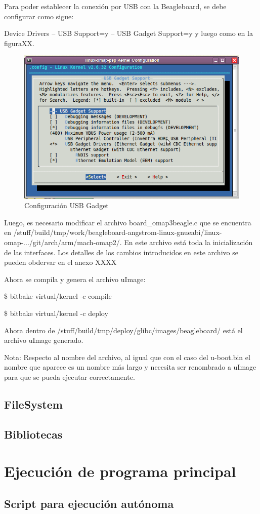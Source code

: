 Para poder establecer la conexión por USB con la Beagleboard, se debe configurar como sigue: 

Device Drivers – USB Support=y – USB Gadget Support=y y luego como en la figuraXX.

\begin{figure}[H]
\centering
  \begin{center}
  \includegraphics[scale=.4]{Imagenes/usb_chica.png} 
  \end{center}
  \caption{Configuración USB Gadget}\label{Fig:HW} 
\end{figure}

Luego, es necesario modificar el archivo board\_omap3beagle.c que se encuentra en /stuff/build/tmp/work/beagleboard-angstrom-linux-gnueabi/linux-omap-.../git/arch/arm/mach-omap2/. En este archivo está toda la inicialización de las interfaces. Los detalles de los cambios introducidos en este archivo se pueden obdervar en el anexo XXXX

Ahora se compila y genera el archivo uImage:

\$ bitbake virtual/kernel -c compile 

\$ bitbake virtual/kernel -c deploy 

Ahora dentro de /stuff/build/tmp/deploy/glibc/images/beagleboard/ está el archivo uImage generado.

Nota: Respecto al nombre del archivo, al igual que con el caso del u-boot.bin el nombre que aparece es un nombre más largo y necesita ser renombrado a uImage para que se pueda ejecutar correctamente.


\subsection{FileSystem}
\subsection{Bibliotecas}


\section{Ejecución de programa principal}
\subsection{Script para ejecución autónoma}
